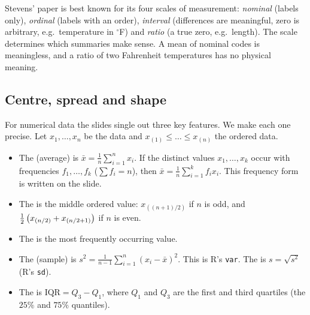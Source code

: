 \begin{note}
Stevens' paper is best known for its four scales of measurement: \emph{nominal} (labels only),
\emph{ordinal} (labels with an order), \emph{interval} (differences are meaningful, zero is
arbitrary, e.g.\ temperature in $^\circ$F) and \emph{ratio} (a true zero, e.g.\ length). The
scale determines which summaries make sense. A mean of nominal codes is meaningless, and a
ratio of two Fahrenheit temperatures has no physical meaning.
\end{note}

\subsection{Centre, spread and shape}
For numerical data the slides single out three key features. We make each one precise. Let
$x_1,\dots,x_n$ be the data and $x_{(1)}\le\dots\le x_{(n)}$ the ordered data.

\begin{definition}\label{def:L01-centre}
\begin{itemize}
  \item The  (average) is $\bar x = \frac1n\sum_{i=1}^n x_i$. If the distinct values $x_1,\dots,x_k$ occur with frequencies $f_1,\dots,f_k$ ($\sum f_i=n$), then $\bar x = \frac1n\sum_{i=1}^k f_ix_i$. This frequency form is written on the slide.
  \item The  is the middle ordered value: $x_{((n+1)/2)}$ if $n$ is odd, and $\tfrac12\left(x_{(n/2)}+x_{(n/2+1)}\right)$ if $n$ is even.
  \item The  is the most frequently occurring value.
\end{itemize}
\end{definition}

\begin{definition}\label{def:L01-spread}
\begin{itemize}
  \item The (sample)  is $s^2=\frac{1}{n-1}\sum_{i=1}^n (x_i-\bar x)^2$. This is R's \texttt{var}. The  is $s=\sqrt{s^2}$ (R's \texttt{sd}).
  \item The  is $\mathrm{IQR}=Q_3-Q_1$, where $Q_1$ and $Q_3$ are the first and third quartiles (the $25\%$ and $75\%$ quantiles).
\end{itemize}
\end{definition}

